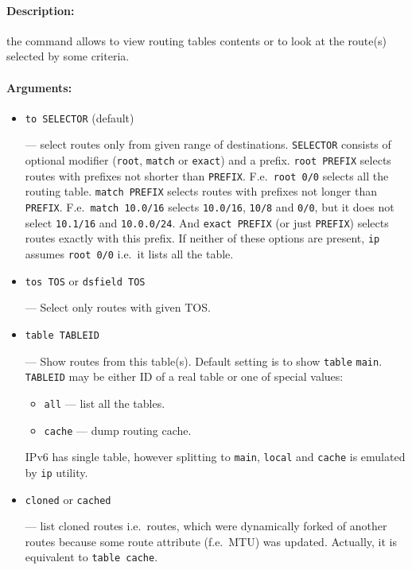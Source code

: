 \paragraph{Description:} the command allows to view routing tables
contents or to look at the route(s) selected by some criteria.


\paragraph{Arguments:}
\begin{itemize}
\item \verb|to SELECTOR| (default)

--- select routes only from given range of destinations. \verb|SELECTOR|
consists of optional modifier (\verb|root|, \verb|match| or \verb|exact|)
and a prefix. \verb|root PREFIX| selects routes with prefixes not shorter
than \verb|PREFIX|. F.e.\ \verb|root 0/0| selects all the routing table.
\verb|match PREFIX| selects routes with prefixes not longer than
\verb|PREFIX|. F.e.\ \verb|match 10.0/16| selects \verb|10.0/16|,
\verb|10/8| and \verb|0/0|, but it does not select \verb|10.1/16| and
\verb|10.0.0/24|. And \verb|exact PREFIX| (or just \verb|PREFIX|)
selects routes exactly with this prefix. If neither of these options
are present, \verb|ip| assumes \verb|root 0/0| i.e.\ it lists all the table.


\item \verb|tos TOS| or \verb|dsfield TOS|

 --- Select only routes with given TOS.


\item \verb|table TABLEID|

 --- Show routes from this table(s). Default setting is to show
\verb|table| \verb|main|. \verb|TABLEID| may be either ID of a real table
or one of special values:
  \begin{itemize}
  \item \verb|all| --- list all the tables.
  \item \verb|cache| --- dump routing cache.
  \end{itemize}
\begin{NB}
  IPv6 has single table, however splitting to \verb|main|, \verb|local|
  and \verb|cache| is emulated by \verb|ip| utility.
\end{NB}

\item \verb|cloned| or \verb|cached|

--- list cloned routes i.e.\ routes, which were dynamically forked of
another routes because some route attribute (f.e.\ MTU) was updated.
Actually, it is equivalent to \verb|table cache|.


\end{itemize}

